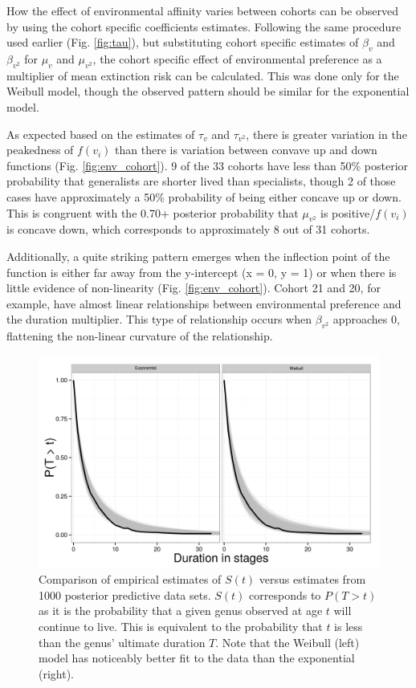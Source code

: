 \documentclass[12pt,letterpaper]{article}
\begin{document}
How the effect of environmental affinity varies between cohorts can be observed by using the cohort specific coefficients estimates. Following the same procedure used earlier (Fig. \ref{fig:tau}), but substituting cohort specific estimates of \(\beta_{v}\) and \(\beta_{v^{2}}\) for \(\mu_{v}\) and \(\mu_{v^{2}}\), the cohort specific effect of environmental preference as a multiplier of mean extinction risk can be calculated. This was done only for the Weibull model, though the observed pattern should be similar for the exponential model. 

As expected based on the estimates of \(\tau_{v}\) and \(\tau_{v^{2}}\), there is greater variation in the peakedness of \(f(v_{i})\) than there is variation between convave up and down functions (Fig. \ref{fig:env_cohort}). 9 of the 33 cohorts have less than 50\% posterior probability that generalists are shorter lived than specialists, though 2 of those cases have approximately a 50\% probability of being either concave up or down. This is congruent with the 0.70+ posterior probability that \(\mu_{v^{2}}\) is positive/\(f(v_{i})\) is concave down, which corresponds to approximately 8 out of 31 cohorts.

Additionally, a quite striking pattern emerges when the inflection point of the function is either far away from the y-intercept (x = 0, y = 1) or when there is little evidence of non-linearity (Fig. \ref{fig:env_cohort}). Cohort 21 and 20, for example, have almost linear relationships between environmental preference and the duration multiplier. This type of relationship occurs when \(\beta_{v^{2}}\) approaches 0, flattening the non-linear curvature of the relationship.

\begin{figure}[ht]
  \centering
  \includegraphics[height = 0.5\textheight,width=\textwidth,keepaspectratio=true]{figure/survival_curves}
  \caption{Comparison of empirical estimates of \(S(t)\) versus estimates from 1000 posterior predictive data sets. \(S(t)\) corresponds to \(P(T > t)\) as it is the probability that a given genus observed at age \(t\) will continue to live. This is equivalent to the probability that \(t\) is less than the genus' ultimate duration \(T\). Note that the Weibull (left) model has noticeably better fit to the data than the exponential (right).}
  \label{fig:surv}
\end{figure}
\end{document}
